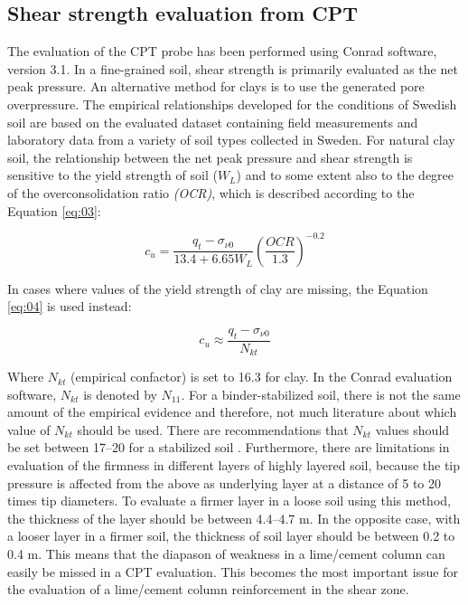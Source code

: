 \documentclass[final,3p,times,onecolumn,authoryear]{elsarticle}
\begin{document}
\subsection{Shear strength evaluation from CPT}

The evaluation of the CPT probe has been performed using Conrad software, version 3.1. In a fine-grained soil, shear strength is primarily evaluated as the net peak pressure. An alternative method for clays is to use the generated pore overpressure. The empirical relationships developed for the conditions of Swedish soil are based on the evaluated dataset containing field measurements and laboratory data from a variety of soil types collected in Sweden. For natural clay soil, the relationship between the net peak pressure and shear strength is sensitive to the yield strength of soil (${W_L}$) and to some extent also to the degree of the overconsolidation ratio \emph{(OCR)}, which is described according to the Equation \ref{eq:03}:

\begin{equation}\label{eq:03}
	c_u = \frac{q_t -\sigma _{\nu 0}}{13.4+6.65W_L} {\left(\frac{OCR}{1.3}\right)}^{-0.2}
\end{equation}

In cases where values of the yield strength of clay are missing, the Equation \ref{eq:04} is used instead: 

\begin{equation}\label{eq:04}
	c_u \approx \frac{q_t -\sigma _{\nu 0}}{N_{kt}}
\end{equation}

Where $N_{kt}$ (empirical confactor) is set to 16.3 for clay. In the Conrad evaluation software, $N_{kt}$ is denoted by $N_{11}$. For a binder-stabilized soil, there is not the same amount of the empirical evidence and therefore, not much literature about which value of $N_{kt}$ should be used. There are recommendations that $N_{kt}$ values should be set between 17--20 for a stabilized soil \citep{Larsson2017,Makusa}. Furthermore, there are limitations in evaluation of the firmness in different layers of highly layered soil, because the tip pressure is affected from the above as underlying layer at a distance of 5 to 20 times tip diameters. To evaluate a firmer layer in a loose soil using this method, the thickness of the layer should be between 4.4--4.7 m. In the opposite case, with a looser layer in a firmer soil, the thickness of soil layer should be between 0.2 to 0.4 m. This means that the diapason of weakness in a lime/cement column can easily be missed in a CPT evaluation. This becomes the most important issue for the evaluation of a lime/cement column reinforcement in the shear zone.
\end{document}
